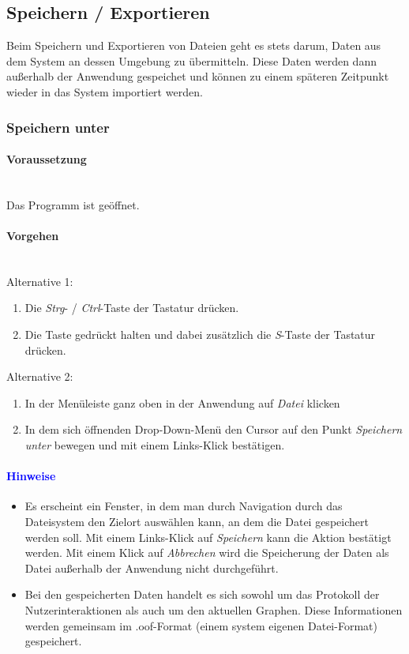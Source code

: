 \documentclass[enabledeprecatedfontcommands,fontsize=11pt,paper=a4,twoside]{scrartcl}
\newcounter{one}
\newcommand*{\hint}{\paragraph{\textcolor{blue}{Hinweise}}}
\newcommand*{\condition}{\paragraph{Voraussetzung}$\;$ \vspace{0.2cm}\\}
\newcommand*{\actions}{\paragraph{Vorgehen} $\;$\vspace{0.2cm}\\}
\begin{document}
		\newpage
\subsection{Speichern / Exportieren} \label{export}
	Beim Speichern und Exportieren von Dateien geht es stets darum, Daten aus dem System an dessen Umgebung zu übermitteln. Diese Daten werden dann außerhalb der Anwendung gespeichet und können zu einem späteren Zeitpunkt wieder in das System importiert werden.

	\newpage
		\subsubsection{Speichern unter}
		\condition 	
		Das Programm ist geöffnet.
		\actions
		Alternative 1:
		\begin{enumerate}
				\item Die \textit{Strg}- / \textit{Ctrl}-Taste der Tastatur drücken.
				\item Die Taste gedrückt halten und dabei zusätzlich die \textit{S}-Taste der Tastatur drücken.
		\end{enumerate}				
		Alternative 2:
		\begin{enumerate}
				\item In der Menüleiste ganz oben in der Anwendung auf \textit{Datei} klicken 
				\item In dem sich öffnenden Drop-Down-Menü den Cursor auf den Punkt \textit{Speichern unter} bewegen und mit einem Links-Klick bestätigen.
		\end{enumerate}		
		\hint
		\begin{itemize}
				\item Es erscheint ein Fenster, in dem man durch Navigation durch das Dateisystem den Zielort auswählen kann, an dem die Datei gespeichert werden soll. Mit einem Links-Klick auf \textit{Speichern} kann die Aktion bestätigt werden. Mit einem Klick auf \textit{Abbrechen} wird die Speicherung der Daten als Datei außerhalb der Anwendung nicht durchgeführt.
				\item Bei den gespeicherten Daten handelt es sich sowohl um das Protokoll der Nutzerinteraktionen als auch um den aktuellen Graphen. Diese Informationen werden gemeinsam im .oof-Format (einem system eigenen Datei-Format) gespeichert.
		\end{itemize}
		
\end{document}
